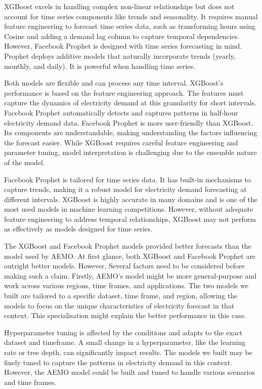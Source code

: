 \documentclass[mstat,12pt]{unswthesis}
\begin{document}
XGBoost excels in handling complex non-linear relationships but does not
account for time series components like trends and seasonality. It
requires manual feature engineering to forecast time series data, such
as transforming hours using Cosine and adding a demand lag column to
capture temporal dependencies. However, Facebook Prophet is designed
with time series forecasting in mind. Prophet deploys additive models
that naturally incorporate trends (yearly, monthly, and daily). It is
powerful when handling time series.

Both models are flexible and can process any time interval. XGBoost's
performance is based on the feature engineering approach. The features
must capture the dynamics of electricity demand at this granularity for
short intervals. Facebook Prophet automatically detects and captures
patterns in half-hour electricity demand data. Facebook Prophet is more
user-friendly than XGBoost. Its components are understandable, making
understanding the factors influencing the forecast easier. While XGBoost
requires careful feature engineering and parameter tuning, model
interpretation is challenging due to the ensemble nature of the model.

Facebook Prophet is tailored for time series data. It has built-in
mechanisms to capture trends, making it a robust model for electricity
demand forecasting at different intervals. XGBoost is highly accurate in
many domains and is one of the most used models in machine learning
competitions. However, without adequate feature engineering to address
temporal relationships, XGBoost may not perform as effectively as models
designed for time series.

The XGBoost and Facebook Prophet models provided better forecasts than
the model used by AEMO. At first glance, both XGBoost and Facebook
Prophet are outright better models. However, Several factors need to be
considered before making such a claim. Firstly, AEMO's model might be
more general-purpose and work across various regions, time frames, and
applications. The two models we built are tailored to a specific
dataset, time frame, and region, allowing the models to focus on the
unique characteristics of electricity forecast in that context. This
specialisation might explain the better performance in this case.

Hyperparameter tuning is affected by the conditions and adapts to the
exact dataset and timeframe. A small change in a hyperparameter, like
the learning rate or tree depth, can significantly impact results. The
models we built may be finely tuned to capture the patterns in
electricity demand in this context. However, the AEMO model could be
built and tuned to handle various scenarios and time frames.
\end{document}
